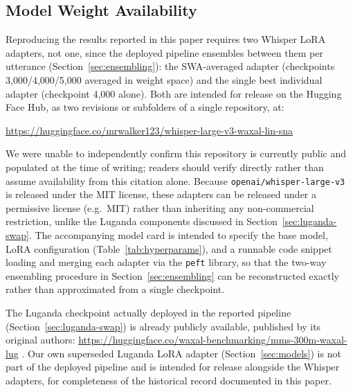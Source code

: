\documentclass[11pt]{article}
\begin{document}
\subsection{Model Weight Availability}
\label{sec:weight-availability}

Reproducing the results reported in this paper requires two Whisper LoRA adapters, not one, since the deployed pipeline ensembles between them per utterance (Section~\ref{sec:ensembling}): the SWA-averaged adapter (checkpoints 3{,}000/4{,}000/5{,}000 averaged in weight space) and the single best individual adapter (checkpoint 4{,}000 alone). Both are intended for release on the Hugging Face Hub, as two revisions or subfolders of a single repository, at:

\begin{center}
\url{https://huggingface.co/mrwalker123/whisper-large-v3-waxal-lin-sna}
\end{center}

\noindent We were unable to independently confirm this repository is currently public and populated at the time of writing; readers should verify directly rather than assume availability from this citation alone. Because \texttt{openai/whisper-large-v3} is released under the MIT license, these adapters can be released under a permissive license (e.g.\ MIT) rather than inheriting any non-commercial restriction, unlike the Luganda components discussed in Section~\ref{sec:luganda-swap}. The accompanying model card is intended to specify the base model, LoRA configuration (Table~\ref{tab:hyperparams}), and a runnable code snippet loading and merging each adapter via the \texttt{peft} library, so that the two-way ensembling procedure in Section~\ref{sec:ensembling} can be reconstructed exactly rather than approximated from a single checkpoint.

The Luganda checkpoint actually deployed in the reported pipeline (Section~\ref{sec:luganda-swap}) is already publicly available, published by its original authors: \url{https://huggingface.co/waxal-benchmarking/mms-300m-waxal-lug} \cite{waxalbenchmarking2026mms300mlug}. Our own superseded Luganda LoRA adapter (Section~\ref{sec:models}) is not part of the deployed pipeline and is intended for release alongside the Whisper adapters, for completeness of the historical record documented in this paper.
\end{document}
